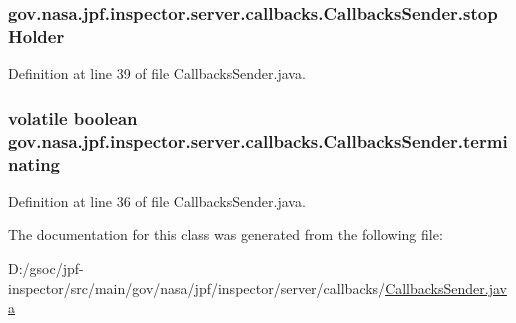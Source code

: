 \subsubsection[{\texorpdfstring{stop\+Holder}{stopHolder}}]{ gov.\+nasa.\+jpf.\+inspector.\+server.\+callbacks.\+Callbacks\+Sender.\+stop\+Holder\hspace{0.3cm}{\ttfamily [private]}}\hypertarget{classgov_1_1nasa_1_1jpf_1_1inspector_1_1server_1_1callbacks_1_1_callbacks_sender_a3c4071a546588209852c336b484a378e}{}\label{classgov_1_1nasa_1_1jpf_1_1inspector_1_1server_1_1callbacks_1_1_callbacks_sender_a3c4071a546588209852c336b484a378e}


Definition at line 39 of file Callbacks\+Sender.\+java.

\subsubsection[{\texorpdfstring{terminating}{terminating}}]{\setlength{\rightskip}{0pt plus 5cm}volatile boolean gov.\+nasa.\+jpf.\+inspector.\+server.\+callbacks.\+Callbacks\+Sender.\+terminating\hspace{0.3cm}{\ttfamily [private]}}\hypertarget{classgov_1_1nasa_1_1jpf_1_1inspector_1_1server_1_1callbacks_1_1_callbacks_sender_a2cf0bafbdc759f89c0b54c36d437effa}{}\label{classgov_1_1nasa_1_1jpf_1_1inspector_1_1server_1_1callbacks_1_1_callbacks_sender_a2cf0bafbdc759f89c0b54c36d437effa}


Definition at line 36 of file Callbacks\+Sender.\+java.



The documentation for this class was generated from the following file\+:\begin{DoxyCompactItemize}
\item 
D\+:/gsoc/jpf-\/inspector/src/main/gov/nasa/jpf/inspector/server/callbacks/\hyperlink{_callbacks_sender_8java}{Callbacks\+Sender.\+java}\end{DoxyCompactItemize}
